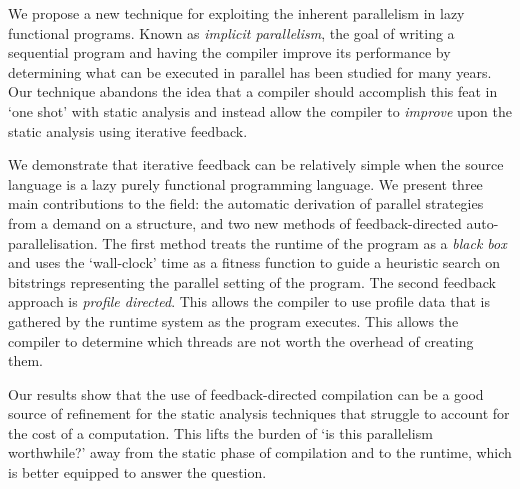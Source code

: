 We propose a new technique for exploiting the inherent parallelism in lazy
functional programs. Known as \emph{implicit parallelism}, the goal of writing
a sequential program and having the compiler improve its performance by
determining what can be executed in parallel has been studied for many years.
Our technique abandons the idea that a compiler should accomplish this feat in
`one shot' with static analysis and instead allow the compiler to
\emph{improve} upon the static analysis using iterative feedback.

We demonstrate that iterative feedback can be relatively simple when the source
language is a lazy purely functional programming language. We present three
main contributions to the field: the automatic derivation of parallel
strategies from a demand on a structure, and two new methods of
feedback-directed auto-parallelisation. The first method treats the runtime of
the program as a \emph{black box} and uses the `wall-clock' time as a fitness
function to guide a heuristic search on bitstrings representing the parallel
setting of the program. The second feedback approach is \emph{profile
directed}. This allows the compiler to use profile data that is gathered by the
runtime system as the program executes. This allows the compiler to determine
which threads are not worth the overhead of creating them.

Our results show that the use of feedback-directed compilation can be a good
source of refinement for the static analysis techniques that struggle to
account for the cost of a computation. This lifts the burden of `is this
parallelism worthwhile?' away from the static phase of compilation and to the
runtime, which is better equipped to answer the question.

